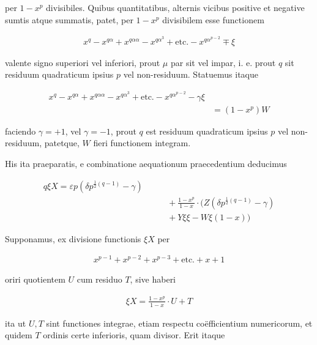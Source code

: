 per $1-x^p$ divisibiles. Quibus quantitatibus, alternis vicibus positive et negative sumtis atque summatis, patet, per $1-x^p$ divisibilem esse functionem

\[
\begin{aligned}
x^q-x^{q\alpha}+x^{q\alpha\alpha}-x^{q\alpha^3}+\text{etc.}-x^{q\alpha^{p-2}}\mp\xi
\end{aligned}
\]

valente signo superiori vel inferiori, prout $\mu$ par sit vel impar, i. e. prout $q$ sit residuum quadraticum ipsius $p$ vel non-residuum. Statuemus itaque

\[
\begin{aligned}
x^q-x^{q\alpha}+x^{q\alpha\alpha}- x^{q\alpha^3}+\text{etc.}-x^{q\alpha^{p-2}}-\gamma\xi\\&=(1-x^p)W
\end{aligned}
\]

faciendo $\gamma=+1$, vel $\gamma=-1$, prout $q$ est residuum quadraticum ipsius $p$ vel non-residuum, patetque, $W$ fieri functionem integram.


His ita praeparatis, e combinatione aequationum praecedentium deducimus

\[
\begin{aligned}
q\xi X=\varepsilon p(\delta p^{\frac12(q-1)}-\gamma)\\&\qquad+\frac{1-x^p}{1-x}\cdot(Z(\delta p^{\frac12(q-1)}-\gamma)\\&\qquad+Y\xi\xi-W\xi(1-x))
\end{aligned}
\]

Supponamus, ex divisione functionis $\xi X$ per

\[
\begin{aligned}
x^{p-1}+x^{p-2}+x^{p-3}+\text{etc.}+x+1
\end{aligned}
\]

oriri quotientem $U$ cum residuo $T$, sive haberi

\[
\begin{aligned}
\xi X=\frac{1-x^p}{1-x}\cdot U+T
\end{aligned}
\]

ita ut $U,T$ sint functiones integrae, etiam respectu coëfficientium numericorum, et quidem $T$ ordinis certe inferioris, quam divisor. Erit itaque

